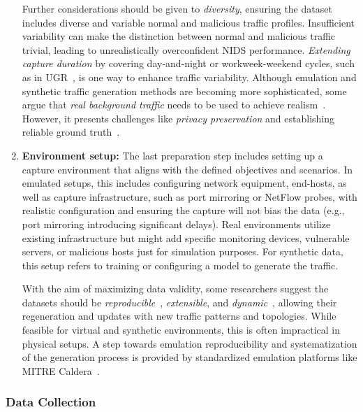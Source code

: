 \begin{enumerate}[nosep, label=\textbf{\arabic*}., topsep=0pt, wide, labelindent=\parindent, itemsep=0pt, parsep=0pt]
Further considerations should be given to \emph{diversity}, ensuring the dataset includes diverse and variable normal and malicious traffic profiles. Insufficient variability can make the distinction between normal and malicious traffic trivial, leading to unrealistically overconfident NIDS performance. \emph{Extending capture duration} by covering day-and-night or workweek-weekend cycles, such as in UGR~\cite{marciafernandez2018_ugr16}, is one way to enhance traffic variability. Although emulation and synthetic traffic generation methods are becoming more sophisticated, some argue that \emph{real background traffic} needs to be used to achieve realism~\cite{ring2019_nids_datasets_survey, marciafernandez2018_ugr16}. However, it presents challenges like \emph{privacy preservation} and establishing reliable ground truth~\cite{landauer2023_ait_ldsv2_dataset}.

\item \textbf{Environment setup:} The last preparation step includes setting up a capture environment that aligns with the defined objectives and scenarios. In emulated setups, this includes configuring network equipment, end-hosts, as well as capture infrastructure, such as port mirroring or NetFlow probes, with realistic configuration and ensuring the capture will not bias the data (e.g., port mirroring introducing significant delays). Real environments utilize existing infrastructure but might add specific monitoring devices, vulnerable servers, or malicious hosts just for simulation purposes. For synthetic data, this setup refers to training or configuring a model to generate the traffic.

With the aim of maximizing data validity, some researchers suggest the datasets should be \emph{reproducible}~\cite{landauer2023_ait_ldsv2_dataset}, \emph{extensible}, and \emph{dynamic}~\cite{ferriyan2021_hikari2021, ring2017_cidds001, shiravi2012_iscx2012}, allowing their regeneration and updates with new traffic patterns and topologies. While feasible for virtual and synthetic environments, this is often impractical in physical setups. A step towards emulation reproducibility and systematization of the generation process is provided by standardized emulation platforms like MITRE Caldera~\cite{mitre2024_caldera}.
\end{enumerate}

\subsubsection{Data Collection}

